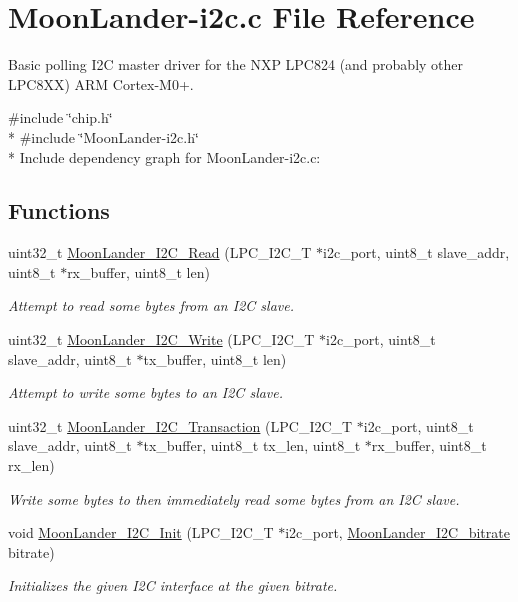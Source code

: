 \hypertarget{MoonLander-i2c_8c}{}\section{Moon\+Lander-\/i2c.c File Reference}
\label{MoonLander-i2c_8c}


Basic polling I2C master driver for the N\+XP L\+P\+C824 (and probably other L\+P\+C8\+XX) A\+RM Cortex-\/\+M0+.  


{\ttfamily \#include \char`\"{}chip.\+h\char`\"{}}\\*
{\ttfamily \#include \char`\"{}Moon\+Lander-\/i2c.\+h\char`\"{}}\\*
Include dependency graph for Moon\+Lander-\/i2c.c\+:
\subsection*{Functions}
\begin{DoxyCompactItemize}
\item 
uint32\+\_\+t \hyperlink{MoonLander-i2c_8c_a198617ba51109894385bb0ee640fce3d}{Moon\+Lander\+\_\+\+I2\+C\+\_\+\+Read} (L\+P\+C\+\_\+\+I2\+C\+\_\+T $\ast$i2c\+\_\+port, uint8\+\_\+t slave\+\_\+addr, uint8\+\_\+t $\ast$rx\+\_\+buffer, uint8\+\_\+t len)
\begin{DoxyCompactList}\small\item\em Attempt to read some bytes from an I2C slave. \end{DoxyCompactList}\item 
uint32\+\_\+t \hyperlink{MoonLander-i2c_8c_afc446bc861639e8c9fb073cad69f34d1}{Moon\+Lander\+\_\+\+I2\+C\+\_\+\+Write} (L\+P\+C\+\_\+\+I2\+C\+\_\+T $\ast$i2c\+\_\+port, uint8\+\_\+t slave\+\_\+addr, uint8\+\_\+t $\ast$tx\+\_\+buffer, uint8\+\_\+t len)
\begin{DoxyCompactList}\small\item\em Attempt to write some bytes to an I2C slave. \end{DoxyCompactList}\item 
uint32\+\_\+t \hyperlink{MoonLander-i2c_8c_aa736d66b137e59b64d8b1b1a85c4cd8b}{Moon\+Lander\+\_\+\+I2\+C\+\_\+\+Transaction} (L\+P\+C\+\_\+\+I2\+C\+\_\+T $\ast$i2c\+\_\+port, uint8\+\_\+t slave\+\_\+addr, uint8\+\_\+t $\ast$tx\+\_\+buffer, uint8\+\_\+t tx\+\_\+len, uint8\+\_\+t $\ast$rx\+\_\+buffer, uint8\+\_\+t rx\+\_\+len)
\begin{DoxyCompactList}\small\item\em Write some bytes to then immediately read some bytes from an I2C slave. \end{DoxyCompactList}\item 
void \hyperlink{MoonLander-i2c_8c_aa8b0b475cb2a4860cb5d6c4a13895129}{Moon\+Lander\+\_\+\+I2\+C\+\_\+\+Init} (L\+P\+C\+\_\+\+I2\+C\+\_\+T $\ast$i2c\+\_\+port, \hyperlink{MoonLander-i2c_8h_a99b692076d07b714e6b130bdc715e3ee}{Moon\+Lander\+\_\+\+I2\+C\+\_\+bitrate} bitrate)
\begin{DoxyCompactList}\small\item\em Initializes the given I2C interface at the given bitrate. \end{DoxyCompactList}\end{DoxyCompactItemize}

